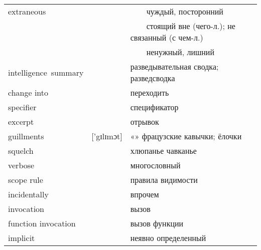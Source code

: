 \documentclass[14pt,a4paper]{article}
\newcommand{\tabitem}{~~\llap{\textbullet}~~}
\begin{document}
{
\linespread{3}
\renewcommand\arraystretch{1}

\fontsize{12pt}{5.5pt}\selectfont
{}\selectfont

\begin{tabularx}{\textwidth}{| m{4cm} | m{3cm} | X |}
 \hline
extraneous & & \tabitem чуждый, посторонний\\
& & \tabitem стоящий вне (чего-л.); не связанный (с чем-л.)\\
& & \tabitem ненужный, лишний\\ \hline 
intelligence~summary & & разведывательная сводка; разведсводка\\ \hline
change into & & переходить\\ \hline
specifier & & спецификатор\\ \hline
excerpt & & отрывок\\ \hline
guillments & ['gɪlɪmɔt] & «» фрацузские кавычки; ёлочки\\ \hline
squelch & & хлюпанье чавканье\\ \hline
verbose & & многословный\\ \hline 
scope rule & & правила видимости\\ \hline
incidentally & & впрочем\\ \hline
invocation & & вызов\\ \hline
function invocation & & вызов функции\\ \hline
implicit & & неявно определенный\\ \hline
\end{tabularx}}
\end{document}
